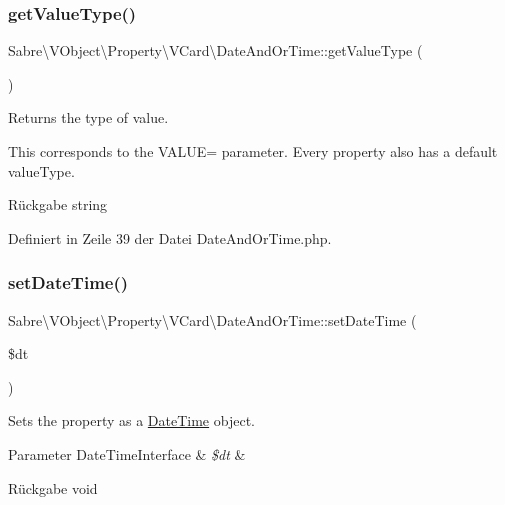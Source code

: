 \subsubsection{\texorpdfstring{get\+Value\+Type()}{getValueType()}}
{\footnotesize\ttfamily Sabre\textbackslash{}\+V\+Object\textbackslash{}\+Property\textbackslash{}\+V\+Card\textbackslash{}\+Date\+And\+Or\+Time\+::get\+Value\+Type (\begin{DoxyParamCaption}{ }\end{DoxyParamCaption})}

Returns the type of value.

This corresponds to the V\+A\+L\+UE= parameter. Every property also has a \textquotesingle{}default\textquotesingle{} value\+Type.

\begin{DoxyReturn}{Rückgabe}
string 
\end{DoxyReturn}


Definiert in Zeile 39 der Datei Date\+And\+Or\+Time.\+php.

\mbox{\label{class_sabre_1_1_v_object_1_1_property_1_1_v_card_1_1_date_and_or_time_a58d4f40d565354e5262a27a59e2f7033}} 
\subsubsection{\texorpdfstring{set\+Date\+Time()}{setDateTime()}}
{\footnotesize\ttfamily Sabre\textbackslash{}\+V\+Object\textbackslash{}\+Property\textbackslash{}\+V\+Card\textbackslash{}\+Date\+And\+Or\+Time\+::set\+Date\+Time (\begin{DoxyParamCaption}\item[{Date\+Time\+Interface}]{\$dt }\end{DoxyParamCaption})}

Sets the property as a \mbox{\hyperlink{class_sabre_1_1_v_object_1_1_property_1_1_v_card_1_1_date_time}{Date\+Time}} object.


\begin{DoxyParams}[1]{Parameter}
Date\+Time\+Interface & {\em \$dt} & \\
\hline
\end{DoxyParams}
\begin{DoxyReturn}{Rückgabe}
void 
\end{DoxyReturn}


